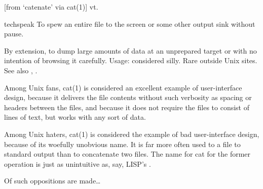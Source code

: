  [from `catenate' via  cat(1)] vt.

\begin{inparaenum}
\item [techspeak] To spew an entire file to the screen or some other output sink
    without pause.
\item By extension, to dump large amounts of data at an unprepared target or
    with no intention of browsing it carefully. Usage: considered silly. Rare
    outside Unix sites. See also , . 
\end{inparaenum}

Among Unix fans, cat(1) is considered an excellent example of user-interface
design, because it delivers the file contents without such verbosity as spacing
or headers between the files, and because it does not require the files to
consist of lines of text, but works with any sort of data.

Among Unix haters, cat(1) is considered the  example of bad
user-interface design, because of its woefully unobvious name. It is far more
often used to  a file to standard output than to concatenate
two files. The name for cat for the former operation is just as unintuitive as,
say, LISP's .

Of such oppositions are  made\dots

